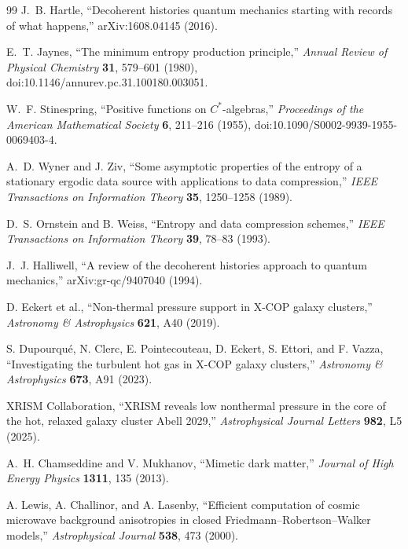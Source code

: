 \documentclass[11pt]{article}
\begin{document}
\begin{thebibliography}{99}
J.~B. Hartle,
``Decoherent histories quantum mechanics starting with records of what happens,''
arXiv:1608.04145 (2016).

E.~T. Jaynes,
``The minimum entropy production principle,''
\emph{Annual Review of Physical Chemistry} \textbf{31}, 579--601 (1980),
doi:10.1146/annurev.pc.31.100180.003051.

W.~F. Stinespring,
``Positive functions on $C^*$-algebras,''
\emph{Proceedings of the American Mathematical Society} \textbf{6}, 211--216 (1955),
doi:10.1090/S0002-9939-1955-0069403-4.

A.~D. Wyner and J. Ziv,
``Some asymptotic properties of the entropy of a stationary ergodic data source with applications to data compression,''
\emph{IEEE Transactions on Information Theory} \textbf{35}, 1250--1258 (1989).

D.~S. Ornstein and B. Weiss,
``Entropy and data compression schemes,''
\emph{IEEE Transactions on Information Theory} \textbf{39}, 78--83 (1993).

J.~J. Halliwell,
``A review of the decoherent histories approach to quantum mechanics,''
arXiv:gr-qc/9407040 (1994).

D. Eckert et al.,
``Non-thermal pressure support in X-COP galaxy clusters,''
\emph{Astronomy \& Astrophysics} \textbf{621}, A40 (2019).

S. Dupourqu\'e, N. Clerc, E. Pointecouteau, D. Eckert, S. Ettori, and F. Vazza,
``Investigating the turbulent hot gas in X-COP galaxy clusters,''
\emph{Astronomy \& Astrophysics} \textbf{673}, A91 (2023).

XRISM Collaboration,
``XRISM reveals low nonthermal pressure in the core of the hot, relaxed galaxy cluster Abell 2029,''
\emph{Astrophysical Journal Letters} \textbf{982}, L5 (2025).

A.~H. Chamseddine and V. Mukhanov,
``Mimetic dark matter,''
\emph{Journal of High Energy Physics} \textbf{1311}, 135 (2013).

A. Lewis, A. Challinor, and A. Lasenby,
``Efficient computation of cosmic microwave background anisotropies in closed Friedmann--Robertson--Walker models,''
\emph{Astrophysical Journal} \textbf{538}, 473 (2000).


\end{thebibliography}
\end{document}
